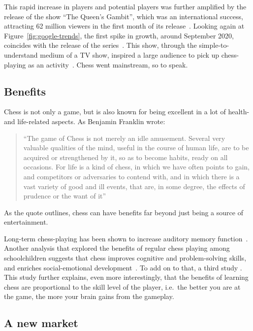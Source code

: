 This rapid increase in players and potential players was further amplified by the release of the show ``The Queen's
Gambit'', which was an international success, attracting 62 million viewers in the first month of its
release~\cite{deadline2020}.
Looking again at Figure~\ref{fig:google-trends}, the first spike in growth, around September 2020, coincides with the
release of the series~\cite{nyt2022}.
This show, through the simple-to-understand medium of a TV show, inspired a large audience to pick up chess-playing as
an activity~\cite{polygon2023}.
Chess went mainstream, so to speak.

\subsection{Benefits}\label{subsec:benefits}

Chess is not only a game, but is also known for being excellent in a lot of health- and life-related aspects.
As Benjamin Franklin wrote: \blockcquote{franklin1786}{``The game of Chess is not merely an idle amusement. Several very
valuable qualities of the mind, useful in the course of human life, are to be acquired or strengthened by it, so as to
become habits, ready on all occasions. For life is a kind of chess, in which we have often points to gain, and
competitors or adversaries to contend with, and in which there is a vast variety of good and ill events, that are, in
some degree, the effects of prudence or the want of it''}.

As the quote outlines, chess can have benefits far beyond just being a source of entertainment.

Long-term chess-playing has been shown to increase auditory memory function~\cite{fattahi2015}.
Another analysis that explored the benefits of regular chess playing among schoolchildren suggests that chess improves
cognitive and problem-solving skills, and enriches social-emotional development~\cite{aciego2012}.
To add on to that, a third study .
This study further explains, even more interestingly, that the benefits of learning chess are proportional to the skill
level of the player, i.e.\ the better you are at the game, the more your brain gains from the gameplay.

\subsection{A new market}\label{subsec:a-new-market}

